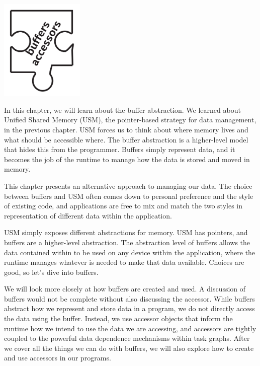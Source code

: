 \begin{center}
	\includegraphics[width=0.3\textwidth]{content/chapter-7/images/1}
\end{center}

In this chapter, we will learn about the buffer abstraction. We learned about Unified Shared Memory (USM), the pointer-based strategy for data management, in the previous chapter. USM forces us to think about where memory lives and what should be accessible where. The buffer abstraction is a higher-level model that hides this from the programmer. Buffers simply represent data, and it becomes the job of the runtime to manage how the data is stored and moved in memory.\par

This chapter presents an alternative approach to managing our data. The choice between buffers and USM often comes down to personal preference and the style of existing code, and applications are free to mix and match the two styles in representation of different data within the application.\par

USM simply exposes different abstractions for memory. USM has pointers, and buffers are a higher-level abstraction. The abstraction level of buffers allows the data contained within to be used on any device within the application, where the runtime manages whatever is needed to make that data available. Choices are good, so let’s dive into buffers.\par

We will look more closely at how buffers are created and used. A discussion of buffers would not be complete without also discussing the accessor. While buffers abstract how we represent and store data in a program, we do not directly access the data using the buffer. Instead, we use accessor objects that inform the runtime how we intend to use the data we are accessing, and accessors are tightly coupled to the powerful data dependence mechanisms within task graphs. After we cover all the things we can do with buffers, we will also explore how to create and use accessors in our programs.\par

























